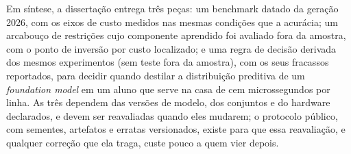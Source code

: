 \vspace{1em}

Em síntese, a dissertação entrega três peças: um benchmark datado da
geração 2026, com os eixos de custo medidos nas mesmas condições que a
acurácia; um arcabouço de restrições cujo componente aprendido foi
avaliado fora da amostra, com o
ponto de inversão por custo localizado; e uma regra de decisão
derivada dos mesmos experimentos (sem teste fora da amostra), com os
seus fracassos reportados, para decidir quando destilar a distribuição
preditiva de um \emph{foundation model} em um aluno que serve na
casa de cem microssegundos por linha. As três dependem das versões de modelo, dos conjuntos
e do hardware declarados, e devem ser reavaliadas quando eles mudarem;
o protocolo público, com sementes, artefatos e erratas versionados,
existe para que essa reavaliação, e qualquer correção que ela traga,
custe pouco a quem vier depois.
